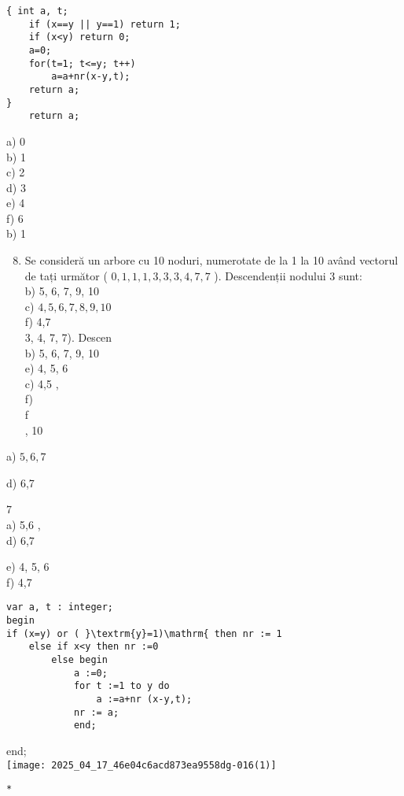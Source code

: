 \begin{verbatim}
{ int a, t;
    if (x==y || y==1) return 1;
    if (x<y) return 0;
    a=0;
    for(t=1; t<=y; t++)
        a=a+nr(x-y,t);
    return a;
}
    return a;
\end{verbatim}

a) 0\\
b) 1\\
c) 2\\
d) 3\\
e) 4\\
f) 6\\
b) 1

\begin{enumerate}
  \setcounter{enumi}{7}
  \item Se consideră un arbore cu 10 noduri, numerotate de la 1 la 10 având vectorul de tați următor ( $0,1,1,1,3,3,3,4,7,7$ ). Descendenții nodului 3 sunt:\\
b) 5, 6, 7, 9, 10\\
c) $4,5,6,7,8,9,10$\\
f) 4,7\\
3, 4, 7, 7). Descen\\
b) 5, 6, 7, 9, 10\\
e) 4, 5, 6\\
c) 4,5 ,\\
f)\\
f\\
, 10
\end{enumerate}

a) $5,6,7$

d) 6,7

7\\
a) 5,6 ,\\
d) 6,7

e) 4, 5, 6\\
f) 4,7

\begin{verbatim}
var a, t : integer;
begin
if (x=y) or ( }\textrm{y}=1)\mathrm{ then nr := 1
    else if x<y then nr :=0
        else begin
            a :=0;
            for t :=1 to y do
                a :=a+nr (x-y,t);
            nr := a;
            end;
\end{verbatim}

end;\\
$\qquad$\\
\texttt{[image: 2025\_04\_17\_46e04c6acd873ea9558dg-016(1)]}

\begin{verbatim}
*
\end{verbatim}

